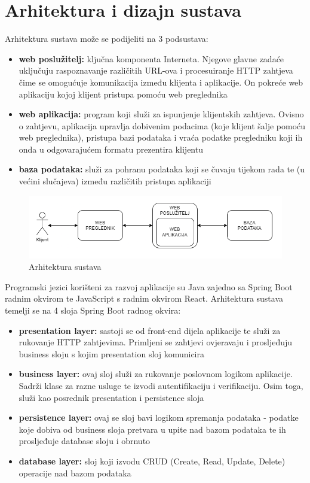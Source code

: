 \chapter{Arhitektura i dizajn sustava}
		
    Arhitektura sustava može se podijeliti na 3 podsustava:
    \begin{itemize}
        \item \textbf{web poslužitelj:} ključna komponenta Interneta. Njegove glavne zadaće uključuju raspoznavanje različitih URL-ova i procesuiranje HTTP zahtjeva čime se omogućuje komunikacija između klijenta i aplikacije. On pokreće web aplikaciju kojoj klijent pristupa pomoću web preglednika
        \item \textbf{web aplikacija:} program koji služi za ispunjenje klijentskih zahtjeva. Ovisno o zahtjevu, aplikacija upravlja dobivenim podacima (koje klijent šalje pomoću web preglednika), pristupa bazi podataka i vraća podatke pregledniku koji ih onda u odgovarajućem formatu prezentira klijentu
        \item \textbf{baza podataka:} služi za pohranu podataka koji se čuvaju tijekom rada te (u većini slučajeva) između različitih pristupa aplikaciji
    \end{itemize}
    
		\begin{figure}[H]
			\includegraphics[scale=1]{slike/arhitektura.PNG} %
			\centering
			\caption{Arhitektura sustava}
			\label{fig:promjene}
		\end{figure}

	Programski jezici korišteni za razvoj aplikacije su Java zajedno sa Spring Boot radnim okvirom te JavaScript s radnim okvirom React. Arhitektura sustava temelji se na 4 sloja Spring Boot radnog okvira:
		
	\begin{itemize}
	    \item \textbf{presentation layer:} sastoji se od front-end dijela aplikacije te služi za rukovanje HTTP zahtjevima. Primljeni se zahtjevi ovjeravaju i prosljeđuju business sloju s kojim presentation sloj komunicira
	    \item \textbf{business layer:} ovaj sloj služi za rukovanje poslovnom logikom aplikacije. Sadrži klase za razne usluge te izvodi autentifikaciju i verifikaciju. Osim toga, služi kao posrednik presentation i persistence sloja
	    \item \textbf{persistence layer:} ovaj se sloj bavi logikom spremanja podataka - podatke koje dobiva od business sloja pretvara u upite nad bazom podataka te ih prosljeđuje database sloju i obrnuto
	    \item \textbf{database layer:} sloj koji izvodu CRUD (Create, Read, Update, Delete) operacije nad bazom podataka
	\end{itemize}
	

